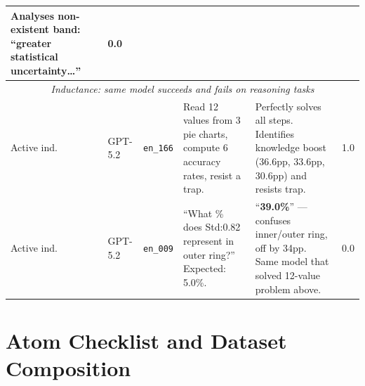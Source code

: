 \begin{table}[H]
\begin{tabular}{|l|l|l|p{4.2cm}|p{4.2cm}|l|}
  Analyses non-existent band: ``greater statistical uncertainty\ldots'' &
  0.0 \\
\hline
\multicolumn{6}{|c|}{\cellcolor{gray!10}\textit{Inductance: same model succeeds and fails on reasoning tasks}} \\
\hline
Active ind. &
  GPT-5.2 &
  \texttt{en\_166} &
  Read 12 values from 3 pie charts, compute 6 accuracy rates, resist a trap. &
  Perfectly solves all steps. Identifies knowledge boost (36.6pp, 33.6pp, 30.6pp) and resists trap. &
  1.0 \\
\hline
Active ind. &
  GPT-5.2 &
  \texttt{en\_009} &
  ``What \% does Std:0.82 represent in outer ring?'' Expected: 5.0\%. &
  ``\textbf{39.0\%}'' --- confuses inner/outer ring, off by 34pp. Same model that solved 12-value problem above. &
  0.0 \\
\hline
\end{tabular}
\renewcommand{\arraystretch}{1.0}
\end{table}

\newpage
\section{Atom Checklist and Dataset Composition}
\label{app:atoms}\label{app:adversarial-samples}\label{app:inferable}

